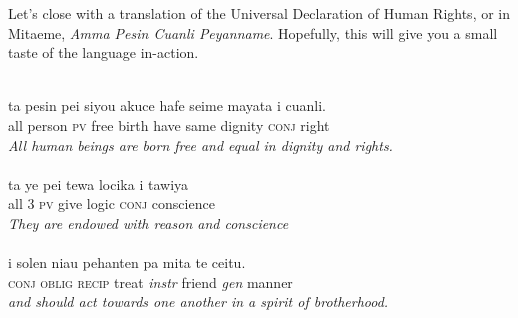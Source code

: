 \documentclass[a4paper]{article}
\begin{document}
Let's close with a translation of the Universal Declaration of Human Rights, or in Mitaeme, \textit{Amma Pesin Cuanli Peyanname}.
Hopefully, this will give you a small taste of the language in-action.\\
\\
\hspace*{1cm}%
\begin{minipage}{.8\textwidth}%
ta pesin pei siyou akuce hafe seime mayata i cuanli.\\
all person \textsc{pv} free birth have same dignity \textsc{conj} right\\
\textit{All human beings are born free and equal in dignity and rights.}\\
\\
ta ye pei tewa locika i tawiya\\
all \textsc{3 pv} give logic \textsc{conj} conscience\\
\textit{They are endowed with reason and conscience}\\
\\
i solen niau pehanten pa mita te ceitu.\\
\textsc{conj oblig recip} treat \textit{instr} friend \textit{gen} manner\\
\textit{and should act towards one another in a spirit of brotherhood.}
\end{minipage}%
\end{document}
